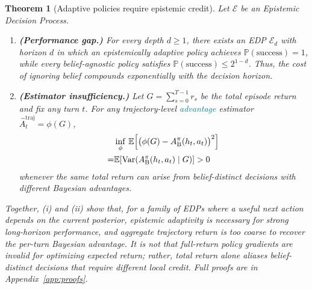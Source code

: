 \documentclass[11pt]{article}
\newcommand{\an}[1]{\textcolor{black}{#1}}
\newcommand{\nk}[1]{\textcolor{teal}{#1}}
\theoremstyle{plain}
\newtheorem{theorem}{Theorem}[section]
\theoremstyle{definition}
\theoremstyle{remark}
\begin{document}
\begin{theorybox}
\begin{theorem}[Adaptive policies require epistemic credit]
\label{thm:necessity}
Let $\mathcal{E}$ be an Epistemic Decision Process.
\begin{enumerate} 
    \item \textbf{(Performance gap.)}
    For every depth $d \geq 1$, there exists an EDP $\mathcal{E}_d$ with
    horizon $d$ in which an epistemically adaptive policy achieves
    $\mathbb{P}(\mathrm{success}) = 1$, while every belief-agnostic policy
    satisfies $\mathbb{P}(\mathrm{success}) \leq 2^{1-d}$. Thus, the cost of ignoring belief compounds exponentially with the decision horizon.

    \item \textbf{(Estimator insufficiency.)}
    Let $G = \sum_{s=0}^{T-1} r_s$ be the total episode return and fix
    any turn $t$. For any trajectory-level \nk{advantage} estimator
    $\widehat{A}_t^{\mathrm{traj}} = \phi(G)$,
    \begin{align}
        &\notag\inf_{\phi}\,
        \mathbb{E}\!\left[
            \bigl(\phi(G) - A_{\mathrm{B}}^\pi(h_t,a_t)\bigr)^2
        \right]\\
        = &\notag\mathbb{E}\!\left[
            \operatorname{Var}\!\left(
                A_{\mathrm{B}}^\pi(h_t,a_t) \mid G
            \right)
        \right] > 0
    \end{align}
 whenever the same total return can arise from belief-distinct
decisions with different Bayesian advantages.
\end{enumerate}

Together, (i) and (ii) show that, for a family of EDPs where a useful next action depends on the current posterior, epistemic adaptivity is necessary for strong long-horizon performance, and aggregate trajectory return is too coarse to recover the per-turn Bayesian advantage. It is not that full-return policy gradients are invalid for optimizing expected return; rather, total return alone aliases belief-distinct decisions that require different local credit. Full proofs are in Appendix~\ref{app:proofs}. 
 
\end{theorem}
\end{theorybox}
\end{document}
